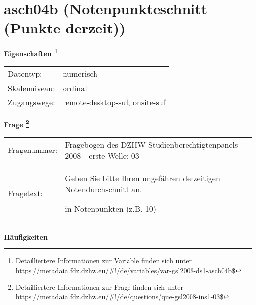 
    \setcounter{footnote}{0}

    \vspace*{-1.8cm}
	\section{asch04b (Notenpunkteschnitt (Punkte derzeit))}
	\label{section:asch04b}



    \vspace*{0.5cm}
    \noindent\textbf{Eigenschaften
	\footnote{Detailliertere Informationen zur Variable finden sich unter
		\url{https://metadata.fdz.dzhw.eu/\#!/de/variables/var-gsl2008-ds1-asch04b$}}}\\
	\begin{tabularx}{\hsize}{@{}lX}
	Datentyp: & numerisch \\
	Skalenniveau: & ordinal \\
	Zugangswege: &
	  remote-desktop-suf, 
	  onsite-suf
 \\
    \end{tabularx}



				\vspace*{0.5cm}
                \noindent\textbf{Frage
	                \footnote{Detailliertere Informationen zur Frage finden sich unter
		              \url{https://metadata.fdz.dzhw.eu/\#!/de/questions/que-gsl2008-ins1-03$}}}\\
				\begin{tabularx}{\hsize}{@{}lX}
					Fragenummer: &
					  Fragebogen des DZHW-Studienberechtigtenpanels 2008 - erste Welle:
					  03
 \\
					Fragetext: & Geben Sie bitte Ihren ungefähren derzeitigen Notendurchschnitt an.\par  in Notenpunkten (z.B. 10) \\
				\end{tabularx}





        		\vspace*{0.5cm}
                \noindent\textbf{Häufigkeiten}

